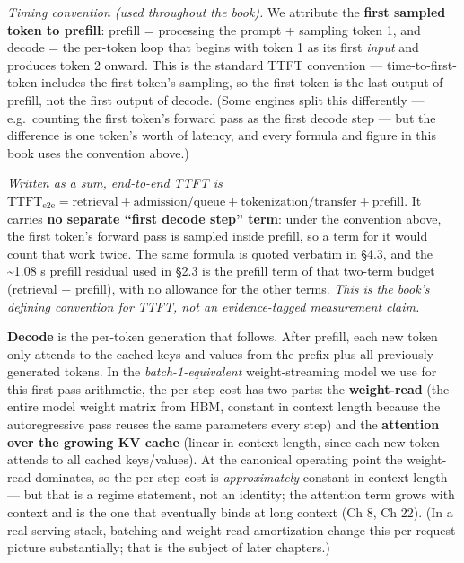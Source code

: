 \emph{Timing convention (used throughout the book).} We attribute the
\textbf{first sampled token to prefill}: prefill = processing the prompt
+ sampling token 1, and decode = the per-token loop that begins with
token 1 as its first \emph{input} and produces token 2 onward. This is
the standard TTFT convention --- time-to-first-token includes the first
token's sampling, so the first token is the last output of prefill, not
the first output of decode. (Some engines split this differently ---
e.g.~counting the first token's forward pass as the first decode step
--- but the difference is one token's worth of latency, and every
formula and figure in this book uses the convention above.)

\emph{Written as a sum, end-to-end TTFT is}
\(\text{TTFT}_{\text{e2e}} = \text{retrieval} + \text{admission/queue} + \text{tokenization/transfer} + \text{prefill}\).
It carries \textbf{no separate ``first decode step'' term}: under the
convention above, the first token's forward pass is sampled inside
prefill, so a term for it would count that work twice. The same formula
is quoted verbatim in §4.3, and the \textasciitilde1.08 s prefill
residual used in §2.3 is the prefill term of that two-term budget
(retrieval + prefill), with no allowance for the other terms. \emph{This
is the book's defining convention for TTFT, not an evidence-tagged
measurement claim.}

\textbf{Decode} is the per-token generation that follows. After prefill,
each new token only attends to the cached keys and values from the
prefix plus all previously generated tokens. In the
\emph{batch-1-equivalent} weight-streaming model we use for this
first-pass arithmetic, the per-step cost has two parts: the
\textbf{weight-read} (the entire model weight matrix from HBM, constant
in context length because the autoregressive pass reuses the same
parameters every step) and the \textbf{attention over the growing KV
cache} (linear in context length, since each new token attends to all
cached keys/values). At the canonical operating point the weight-read
dominates, so the per-step cost is \emph{approximately} constant in
context length --- but that is a regime statement, not an identity; the
attention term grows with context and is the one that eventually binds
at long context (Ch 8, Ch 22). (In a real serving stack, batching and
weight-read amortization change this per-request picture substantially;
that is the subject of later chapters.)

